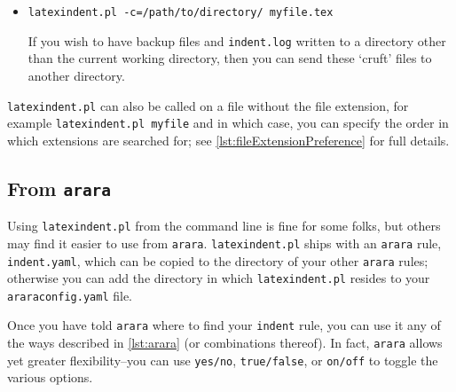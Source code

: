 \documentclass[11pt]{article}
\newcommand{\verbitem}[1]{\small\PVerb{#1}}
\begin{document}
\begin{itemize}[labelsep=.25cm]
	\item[\verbitem{-c, --cruft=<directory>}]\lstinline!latexindent.pl -c=/path/to/directory/ myfile.tex!

	      If you wish to have backup files and \lstinline!indent.log! written to a directory
	      other than the current working directory, then you can send these `cruft' files
	      to another directory.
\end{itemize}

\lstinline!latexindent.pl! can also be called on a file without the file extension, for
example \lstinline[breaklines=true,breakatwhitespace=true,]!latexindent.pl myfile! and in which case, you can specify
the order in which extensions are searched for; see \vref{lst:fileExtensionPreference}
for full details.

\subsection{From \lstinline!arara!}\label{sec:arara}
Using \lstinline!latexindent.pl! from the command line is fine for some folks, but
others may find it easier to use from \lstinline!arara!. \lstinline!latexindent.pl!
ships with an \lstinline!arara! rule, \lstinline!indent.yaml!, which can be copied
to the directory of
your other \lstinline!arara! rules; otherwise  you can add the directory in which \lstinline!latexindent.pl!
resides to your \lstinline!araraconfig.yaml! file.

Once you have told \lstinline!arara! where to find your \lstinline!indent! rule,
you can use it any of the ways described in \cref{lst:arara} (or combinations thereof).
In fact, \lstinline!arara! allows yet greater flexibility--you can use \lstinline!yes/no!, \lstinline!true/false!, or \lstinline!on/off! to toggle the various options.

\end{document}
